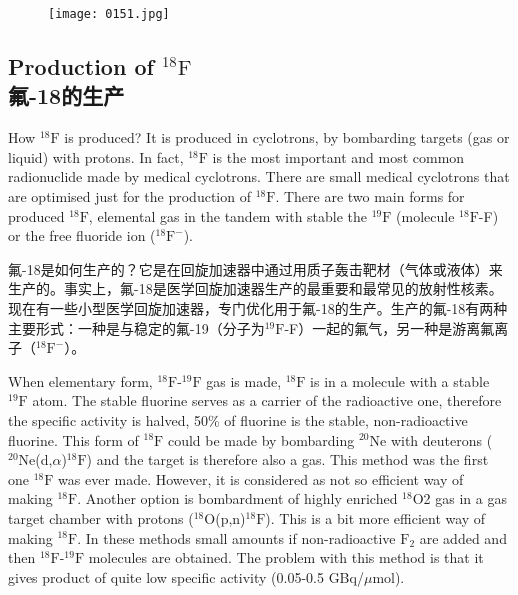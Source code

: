 \documentclass[dvipsnames, svgnames,a4paper,11pt]{article}
\begin{document}
\begin{figure}[h]
	\centering
    \texttt{[image: 0151.jpg]}    
     \label{fig162}
\end{figure}

\subsection{Production of ${}^\mathrm{18}\mathrm{F}$ \\氟-18的生产}
How ${}^\mathrm{18}\mathrm{F}$ is produced? It is produced in cyclotrons, by bombarding targets (gas or
liquid) with protons. In fact, ${}^\mathrm{18}\mathrm{F}$ is the most important and most common radionuclide
made by medical cyclotrons. There are small medical cyclotrons that are optimised
just for the production of ${}^\mathrm{18}\mathrm{F}$. There are two main forms for produced ${}^\mathrm{18}\mathrm{F}$, elemental
gas in the tandem with stable the ${}^\mathrm{19}\mathrm{F}$ (molecule ${}^\mathrm{18}\mathrm{F}$-F) or the free fluoride ion (${}^\mathrm{18}\mathrm{F^-}$).

氟-18是如何生产的？它是在回旋加速器中通过用质子轰击靶材（气体或液体）来生产的。事实上，氟-18是医学回旋加速器生产的最重要和最常见的放射性核素。现在有一些小型医学回旋加速器，专门优化用于氟-18的生产。生产的氟-18有两种主要形式：一种是与稳定的氟-19（分子为${}^\mathrm{19}\mathrm{F}$-F）一起的氟气，另一种是游离氟离子（${}^\mathrm{18}\mathrm{F^-}$）。

When elementary form, ${}^\mathrm{18}\mathrm{F}$-${}^\mathrm{19}\mathrm{F}$ gas is made, ${}^\mathrm{18}\mathrm{F}$ is in a molecule with a stable ${}^\mathrm{19}\mathrm{F}$
atom. The stable fluorine serves as a carrier of the radioactive one, therefore the
specific activity is halved, 50\% of fluorine is the stable, non-radioactive fluorine. This
form of ${}^\mathrm{18}\mathrm{F}$ could be made by bombarding ${}^\mathrm{20}\mathrm{Ne}$ with deuterons (${}^\mathrm{20}\mathrm{Ne}$(d,$\alpha$)${}^\mathrm{18}\mathrm{F}$) and the
target is therefore also a gas. This method was the first one ${}^\mathrm{18}\mathrm{F}$ was ever made.
However, it is considered as not so efficient way of making ${}^\mathrm{18}\mathrm{F}$. Another option is
bombardment of highly enriched ${}^\mathrm{18}\mathrm{O}$2 gas in a gas target chamber with protons
(${}^\mathrm{18}\mathrm{O}$(p,n)${}^\mathrm{18}\mathrm{F}$). This is a bit more efficient way of making ${}^\mathrm{18}\mathrm{F}$. In these methods small
amounts if non-radioactive $\mathrm{F}_2$ are added and then ${}^\mathrm{18}\mathrm{F}$-${}^\mathrm{19}\mathrm{F}$ molecules are obtained.
The problem with this method is that it gives product of quite low specific activity
(0.05-0.5 GBq/$\mu$mol).
\end{document}
